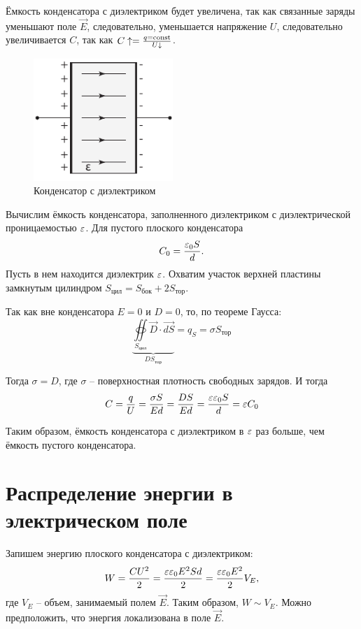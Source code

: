     Ёмкость конденсатора с диэлектриком будет увеличена, так как связанные
    заряды уменьшают поле \( \vec{E} \), следовательно, уменьшается  напряжение
    \( U \), следовательно увеличивается \( C \), так как
    \( C\uparrow = \frac{q=\mathrm{const}}{U\downarrow} \).
    \begin{figure}[h]
        \center
        \includegraphics[width=0.47\textwidth]{lec05/capacitor.pdf}
        \caption{Конденсатор с диэлектриком}
    \end{figure}
    Вычислим ёмкость конденсатора, заполненного диэлектриком с диэлектрической
    проницаемостью \( \varepsilon \). Для пустого плоского конденсатора
    \[
        C_0 = \frac{\varepsilon_0S}{d}.
    \]
    Пусть в нем находится диэлектрик \( \varepsilon \). Охватим участок верхней
    пластины замкнутым цилиндром
    \( S_{\textit{цил}} = S_{\textit{бок}} + 2S_{\textit{тор}} \).
    
    Так как вне конденсатора \( E = 0 \) и \( D = 0 \), то, по теореме Гаусса:
    \[
        \underbrace{\oiint\limits_{ S_{\textit{цил}} }\vec{D}\cdot\vec{dS}
        }_{DS_{\textit{тор}}} = q_S = \sigma S_{\textit{тор}}
    \]
    
    Тогда \( \sigma = D \), где \( \sigma \) -- поверхностная плотность
    свободных зарядов. И тогда
    \[
        C = \frac{q}{U} = \frac{\sigma S}{Ed} = \frac{DS}{Ed} =
        \frac{\varepsilon\varepsilon_0 S}{d} = \varepsilon C_0
    \]
    
    Таким образом, ёмкость конденсатора с диэлектриком в \( \varepsilon \) раз
    больше, чем ёмкость пустого конденсатора.
    
\section{Распределение энергии в электрическом поле}

    Запишем энергию плоского конденсатора с диэлектриком:
    \[
        W = \frac{CU^2}{2} = \frac{\varepsilon\varepsilon_0E^2Sd}{2} =
        \frac{\varepsilon\varepsilon_0E^2}{2}V_E,
    \]
    где \( V_E \) -- объем, занимаемый полем \( \vec{E} \). Таким образом,
    \( W \sim V_E \). Можно предположить, что энергия локализована в поле
    \( \vec{E} \).
    
